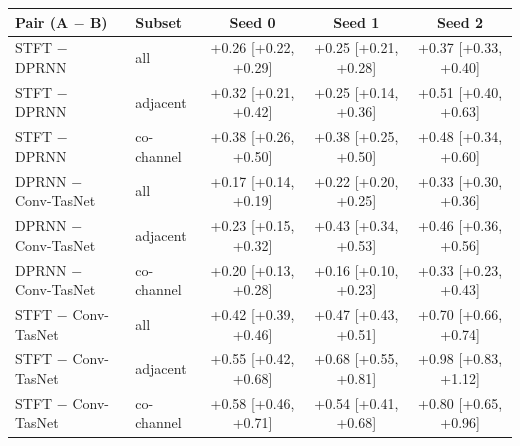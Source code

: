 \begin{tabular}{llccc}
\toprule
Pair (A $-$ B) & Subset & Seed 0 & Seed 1 & Seed 2 \\
\midrule
STFT $-$ DPRNN & all & +0.26 [+0.22, +0.29] & +0.25 [+0.21, +0.28] & +0.37 [+0.33, +0.40] \\
STFT $-$ DPRNN & adjacent & +0.32 [+0.21, +0.42] & +0.25 [+0.14, +0.36] & +0.51 [+0.40, +0.63] \\
STFT $-$ DPRNN & co-channel & +0.38 [+0.26, +0.50] & +0.38 [+0.25, +0.50] & +0.48 [+0.34, +0.60] \\
\midrule
DPRNN $-$ Conv-TasNet & all & +0.17 [+0.14, +0.19] & +0.22 [+0.20, +0.25] & +0.33 [+0.30, +0.36] \\
DPRNN $-$ Conv-TasNet & adjacent & +0.23 [+0.15, +0.32] & +0.43 [+0.34, +0.53] & +0.46 [+0.36, +0.56] \\
DPRNN $-$ Conv-TasNet & co-channel & +0.20 [+0.13, +0.28] & +0.16 [+0.10, +0.23] & +0.33 [+0.23, +0.43] \\
\midrule
STFT $-$ Conv-TasNet & all & +0.42 [+0.39, +0.46] & +0.47 [+0.43, +0.51] & +0.70 [+0.66, +0.74] \\
STFT $-$ Conv-TasNet & adjacent & +0.55 [+0.42, +0.68] & +0.68 [+0.55, +0.81] & +0.98 [+0.83, +1.12] \\
STFT $-$ Conv-TasNet & co-channel & +0.58 [+0.46, +0.71] & +0.54 [+0.41, +0.68] & +0.80 [+0.65, +0.96] \\
\bottomrule
\end{tabular}
